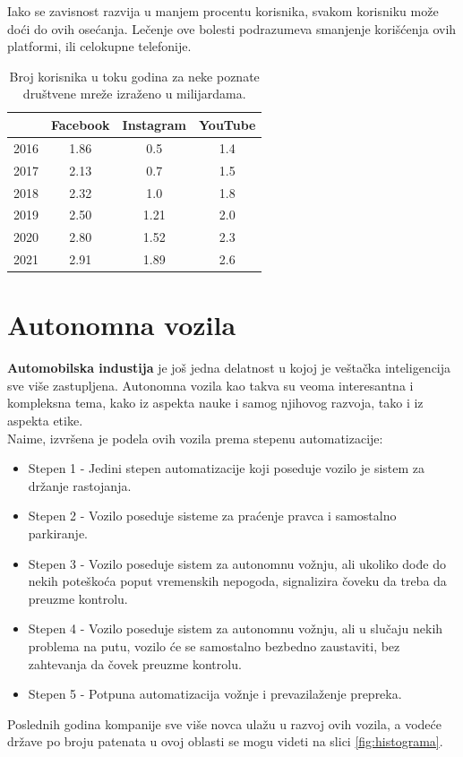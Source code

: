 \documentclass[a4paper]{article}
\begin{document}
Iako se zavisnost razvija u manjem procentu korisnika, svakom korisniku može doći do ovih osećanja. Lečenje ove bolesti podrazumeva smanjenje korišćenja ovih platformi, ili celokupne telefonije.


\begin{table}[h!]
\begin{center}

\begin{tabular}{|c|c|c|c|} \hline
 & Facebook & Instagram & YouTube\\ \hline
2016 & 1.86 & 0.5 & 1.4 \\ \hline
2017 & 2.13 & 0.7 & 1.5\\ \hline
2018 & 2.32 & 1.0 & 1.8 \\ \hline
2019 & 2.50 & 1.21 & 2.0 \\ \hline
2020 & 2.80 & 1.52 & 2.3 \\ \hline
2021 & 2.91 & 1.89 & 2.6 \\ \hline
\end{tabular}
\label{tab:tabela1}
\end{center}
\caption{Broj korisnika u toku godina za neke poznate društvene mreže izraženo u milijardama.}
\end{table}
 


\section{Autonomna vozila}
\label{sec:Autonomna vozila}
\textbf{Automobilska industija} je još jedna delatnost u kojoj je veštačka inteligencija sve više zastupljena. Autonomna vozila kao takva su veoma interesantna i kompleksna tema, kako iz aspekta nauke i samog njihovog razvoja, tako i iz aspekta etike.\\
Naime, izvršena je podela ovih vozila prema stepenu automatizacije:
\begin{itemize}
 \item {Stepen 1 - Jedini stepen automatizacije koji poseduje vozilo je sistem za držanje rastojanja.}
 \item {Stepen 2 - Vozilo poseduje sisteme za praćenje pravca i samostalno parkiranje.}
 \item {Stepen 3 - Vozilo poseduje sistem za autonomnu vožnju, ali ukoliko dođe do nekih poteškoća poput vremenskih nepogoda, signalizira čoveku da treba da preuzme kontrolu.}
 \item {Stepen 4 - Vozilo poseduje sistem za autonomnu vožnju, ali u slučaju nekih problema na putu, vozilo će se samostalno bezbedno zaustaviti, bez zahtevanja da čovek preuzme kontrolu.}
 \item {Stepen 5 - Potpuna automatizacija vožnje i prevazilaženje prepreka.}
\end{itemize} 
Poslednih godina kompanije sve više novca ulažu u razvoj ovih vozila, a vodeće države po broju patenata u ovoj oblasti se mogu videti na slici \ref{fig:histograma}.
\end{document}

